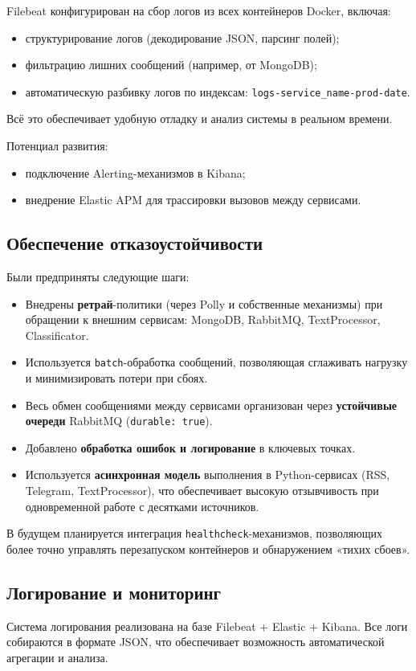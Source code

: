 Filebeat конфигурирован на сбор логов из всех контейнеров Docker, включая:
\begin{itemize}
  \item структурирование логов (декодирование JSON, парсинг полей);
  \item фильтрацию лишних сообщений (например, от MongoDB);
  \item автоматическую разбивку логов по индексам: \texttt{logs-{service\_name}-prod-{date}}.
\end{itemize}

Всё это обеспечивает удобную отладку и анализ системы в реальном времени.

Потенциал развития:
\begin{itemize}
  \item подключение Alerting-механизмов в Kibana;
  \item внедрение Elastic APM для трассировки вызовов между сервисами.
\end{itemize}

\subsection{Обеспечение отказоустойчивости}
Были предприняты следующие шаги:
\begin{itemize}
  \item Внедрены \textbf{ретрай}-политики (через Polly и собственные механизмы) при обращении к внешним сервисам: MongoDB, RabbitMQ, TextProcessor, Classificator.
  \item Используется \texttt{batch}-обработка сообщений, позволяющая сглаживать нагрузку и минимизировать потери при сбоях.
  \item Весь обмен сообщениями между сервисами организован через \textbf{устойчивые очереди} RabbitMQ (\texttt{durable: true}).
  \item Добавлено \textbf{обработка ошибок и логирование} в ключевых точках.
  \item Используется \textbf{асинхронная модель} выполнения в Python-сервисах (RSS, Telegram, TextProcessor), что обеспечивает высокую отзывчивость при одновременной работе с десятками источников.
\end{itemize}

В будущем планируется интеграция \texttt{healthcheck}-механизмов, позволяющих более точно управлять перезапуском контейнеров и обнаружением «тихих сбоев».

\subsection{Логирование и мониторинг}
Система логирования реализована на базе Filebeat + Elastic + Kibana.
Все логи собираются в формате JSON, что обеспечивает возможность автоматической агрегации и анализа.

